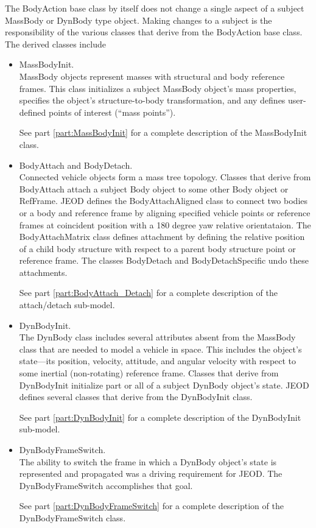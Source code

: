 The BodyAction base class by itself does not change a single
aspect of a subject MassBody or DynBody type object. Making changes to a
subject is the responsibility of the various classes that derive from the
BodyAction base class. The derived classes include
\begin{itemize}
\item MassBodyInit. \\
MassBody objects represent masses with structural and body reference frames.
This class initializes a subject MassBody object's mass properties,
specifies the object's structure-to-body transformation, and
any defines user-defined points of interest (``mass points'').

See part \ref{part:MassBodyInit} for a complete description of the
MassBodyInit class.

\item BodyAttach and BodyDetach. \\
Connected vehicle objects form a mass tree topology.
Classes that derive from BodyAttach attach a subject Body object to
some other Body object or RefFrame. JEOD defines the BodyAttachAligned class to connect
two bodies or a body and reference frame by aligning specified vehicle points or reference frames at coincident
position with a 180 degree yaw relative orientataion. The BodyAttachMatrix
class defines attachment by defining the relative position of a child body
structure with respect to a parent body structure point or reference frame.
The classes BodyDetach and BodyDetachSpecific undo
these attachments.

See part \ref{part:BodyAttach_Detach} for a complete description of the
attach/detach sub-model.

\item DynBodyInit. \\
The DynBody class includes several attributes absent from the MassBody class that are
needed to model a vehicle in space. This includes the object's state---its
position, velocity, attitude, and angular velocity with respect to some
inertial (non-rotating) reference frame. Classes that derive from
DynBodyInit initialize part or all of a subject DynBody object's state.
JEOD defines several classes that derive from the DynBodyInit class.

See part \ref{part:DynBodyInit} for a complete description of the
DynBodyInit sub-model.

\item DynBodyFrameSwitch. \\
The ability to switch the frame in which a DynBody object's state is
represented and propagated was a driving requirement for JEOD.
The DynBodyFrameSwitch accomplishes that goal.

See part \ref{part:DynBodyFrameSwitch} for a complete description of the
DynBodyFrameSwitch class.
\end{itemize}

